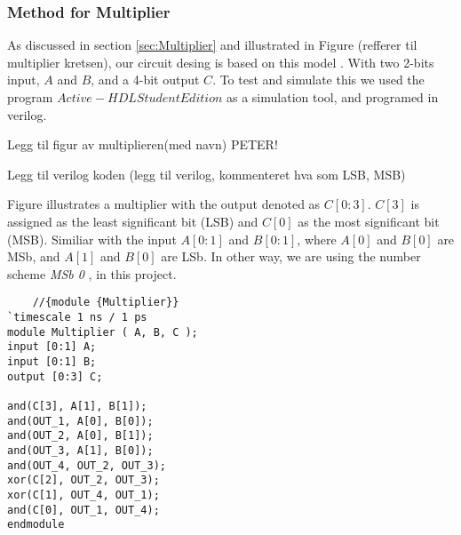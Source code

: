 \subsubsection{Method for Multiplier} \label{Method-Multiplier}
As discussed in section \ref{sec:Multiplier} and illustrated in Figure (refferer til multiplier kretsen), our circuit desing is based on this model . With two 2-bits input, $A$ and $B$, and a 4-bit output $C$. To test and simulate this we used the program $Active-HDL Student Edition$ as a simulation tool, and programed in verilog. 

Legg til figur av multiplieren(med navn) PETER!

Legg til verilog koden (legg til verilog, kommenteret hva som LSB, MSB)

Figure illustrates a multiplier with the output denoted as $C[0:3]$. $C[3]$ is assigned as the least significant bit (LSB) and $C[0]$ as the most significant bit (MSB). Similiar with the input $A[0:1]$ and $B[0:1]$, where $A[0] $ and $B[0]$ are MSb, and $A[1]$ and $B[0]$ are LSb. In other way, we are using the number scheme \emph{MSb 0} \cite{wikipediacontributors_2023_bit}, in this project.

\begin{lstlisting}
    //{module {Multiplier}}	
`timescale 1 ns / 1 ps
module Multiplier ( A, B, C );
input [0:1] A;
input [0:1] B;
output [0:3] C;

and(C[3], A[1], B[1]);
and(OUT_1, A[0], B[0]);
and(OUT_2, A[0], B[1]);
and(OUT_3, A[1], B[0]);
and(OUT_4, OUT_2, OUT_3);
xor(C[2], OUT_2, OUT_3); 
xor(C[1], OUT_4, OUT_1);
and(C[0], OUT_1, OUT_4);
endmodule
\end{lstlisting}
